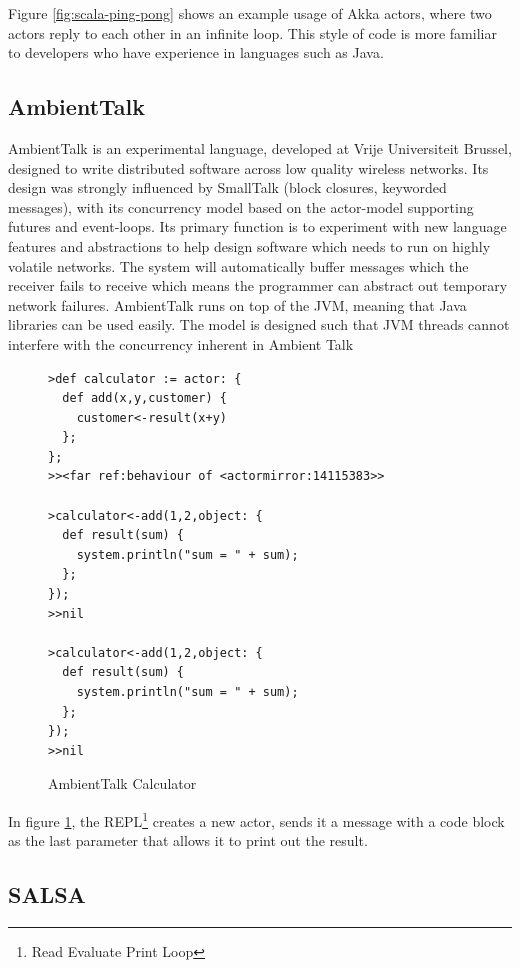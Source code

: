 \documentclass[pdftex,11pt,a4paper]{report}
\begin{document}
Figure \ref{fig:scala-ping-pong} shows an example usage of Akka actors, where two actors reply to each other in an infinite loop.
This style of code is more familiar to developers who have experience in languages such as Java.

\subsection{AmbientTalk}
\label{sec:ambienttalk}

AmbientTalk is an experimental language, developed at Vrije Universiteit Brussel, designed to write distributed software across low quality wireless networks.
Its design was strongly influenced by SmallTalk (block closures, keyworded messages), with its concurrency model based on the actor-model supporting futures and event-loops.
Its primary function is to experiment with new language features and abstractions to help design software which needs to run on highly volatile networks.
The system will automatically buffer messages which the receiver fails to receive which means the programmer can abstract out temporary network failures\cite{ambienttalk-failure}.
AmbientTalk runs on top of the JVM, meaning that Java libraries can be used easily.
The model is designed such that JVM threads cannot interfere with the concurrency inherent in Ambient Talk\cite{ambienttalk-interfere}

\begin{figure}[H]
\begin{verbatim}
>def calculator := actor: {
  def add(x,y,customer) {
    customer<-result(x+y)
  };
};
>><far ref:behaviour of <actormirror:14115383>>

>calculator<-add(1,2,object: {
  def result(sum) {
    system.println("sum = " + sum);
  };
});
>>nil

>calculator<-add(1,2,object: {
  def result(sum) {
    system.println("sum = " + sum);
  };
});
>>nil
\end{verbatim}
\caption{AmbientTalk Calculator\cite{ambienttalk-example}}
\label{fig:ambienttalk-calc}
\end{figure}

In figure \ref{fig:ambienttalk-calc}, the REPL\footnote{Read Evaluate Print Loop} creates a new actor, sends it a message with a code block as the last parameter that allows it to print out the result.

\subsection{SALSA}
\end{document}
